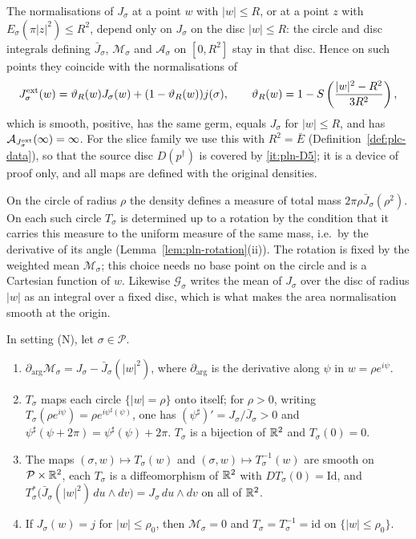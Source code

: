 The normalisations of $J_\sigma$ at a point $w$ with $|w|\le R$, or at a point $z$ with $E_\sigma(\pi|z|^2)\le R^2$,
depend only on $J_\sigma$ on the disc $|w|\le R$: the circle and disc integrals defining $\bar J_\sigma$,
$\mathcal M_\sigma$ and $\mathcal A_\sigma$ on $[0,R^2]$ stay in that disc. Hence on such points they coincide with the
normalisations of
\[
 J^{\rm ext}_\sigma(w)=\vartheta_R(w)J_\sigma(w)
                  +(1-\vartheta_R(w))j(\sigma),\qquad
 \vartheta_R(w)=1-S\left(\frac{|w|^2-R^2}{3R^2}\right),
\]
which is smooth, positive, has the same germ, equals $J_\sigma$ for $|w|\le R$, and has
$\mathcal A_{J^{\rm ext}_\sigma}(\infty)=\infty$. For the slice family we use this with $R^2=\bar E$
(Definition~\ref{def:plc-data}), so that the source disc $D(p^\dagger)$ is covered by \ref{it:pln-D5}; it is a device
of proof only, and all maps are defined with the original densities.

On the circle of radius $\rho$ the density defines a measure of total mass $2\pi\rho\bar J_\sigma(\rho^2)$.
On each such circle $T_\sigma$ is determined up to a rotation by the condition that it carries this measure to
the uniform measure of the same mass, i.e.\ by the derivative of its angle (Lemma~\ref{lem:pln-rotation}(ii)). The
rotation is fixed by the weighted mean $\mathcal M_\sigma$; this choice needs no base point on the circle and is a
Cartesian function of $w$. Likewise $\mathcal G_\sigma$ writes the
mean of $J_\sigma$ over the disc of radius $|w|$ as an integral over a fixed disc, which is what makes the
area normalisation smooth at the origin.

\begin{lemma}\label{lem:pln-rotation}
In setting (N), let $\sigma\in\mathcal P$.
\begin{enumerate}[label=(\roman*)]
\item $\partial_{\arg}\mathcal M_\sigma=J_\sigma-\bar J_\sigma(|w|^2)$, where $\partial_{\arg}$ is the
 derivative along $\psi$ in $w=\rho e^{i\psi}$.
\item $T_\sigma$ maps each circle $\{|w|=\rho\}$ onto itself; for $\rho>0$, writing
 $T_\sigma(\rho e^{i\psi})=\rho e^{i\psi^\sharp(\psi)}$, one has $(\psi^\sharp)'=J_\sigma/\bar J_\sigma>0$ and
 $\psi^\sharp(\psi+2\pi)=\psi^\sharp(\psi)+2\pi$. $T_\sigma$ is a bijection of $\mathbb{R}^2$ and $T_\sigma(0)=0$.
\item The maps $(\sigma,w)\mapsto T_\sigma(w)$ and $(\sigma,w)\mapsto T_\sigma^{-1}(w)$ are smooth on
 $\mathcal P\times\mathbb{R}^2$, each $T_\sigma$ is a diffeomorphism of $\mathbb{R}^2$ with $DT_\sigma(0)=\mathrm{Id}$, and
 $T_\sigma^*\bigl(\bar J_\sigma(|w|^2)\,du\wedge dv\bigr)=J_\sigma\,du\wedge dv$ on all of $\mathbb{R}^2$.
\item If $J_\sigma(w)=j$ for $|w|\le\rho_0$, then $\mathcal M_\sigma=0$ and $T_\sigma=T_\sigma^{-1}=\mathrm{id}$
 on $\{|w|\le\rho_0\}$.
\end{enumerate}
\end{lemma}


